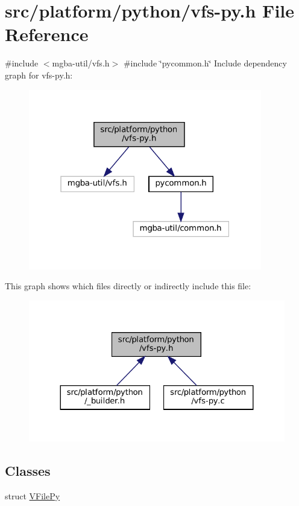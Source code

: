 \hypertarget{vfs-py_8h}{}\section{src/platform/python/vfs-\/py.h File Reference}
\label{vfs-py_8h}
{\ttfamily \#include $<$mgba-\/util/vfs.\+h$>$}\newline
{\ttfamily \#include \char`\"{}pycommon.\+h\char`\"{}}\newline
Include dependency graph for vfs-\/py.h\+:
\nopagebreak
\begin{figure}[H]
\begin{center}
\leavevmode
\includegraphics[width=289pt]{vfs-py_8h__incl}
\end{center}
\end{figure}
This graph shows which files directly or indirectly include this file\+:
\nopagebreak
\begin{figure}[H]
\begin{center}
\leavevmode
\includegraphics[width=324pt]{vfs-py_8h__dep__incl}
\end{center}
\end{figure}
\subsection*{Classes}
\begin{DoxyCompactItemize}
\item 
struct \mbox{\hyperlink{vfs-py_8h_struct_v_file_py}{V\+File\+Py}}
\end{DoxyCompactItemize}
